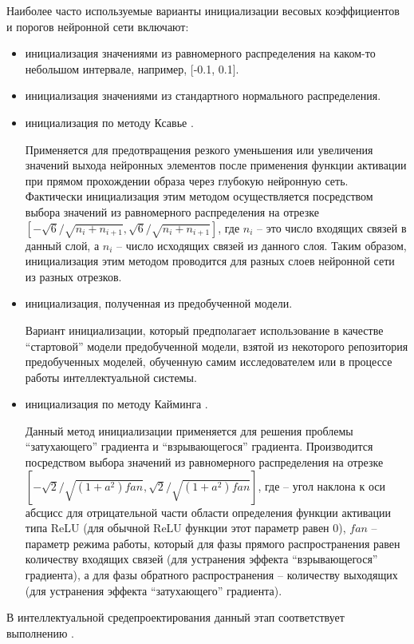 Наиболее часто используемые варианты инициализации весовых коэффициентов и порогов нейронной сети включают:
\begin{itemize}
	\item инициализация значениями из равномерного распределения на каком-то небольшом интервале, например, [-0.1, 0.1].
	\item инициализация значениями из стандартного нормального распределения.
	\item инициализация по методу Ксавье .

	Применяется для предотвращения резкого уменьшения или увеличения значений выхода нейронных элементов после применения функции активации при прямом прохождении образа через глубокую нейронную сеть. Фактически инициализация этим методом осуществляется посредством выбора значений из равномерного распределения на отрезке $[- \sqrt{6} / \sqrt{n_i+n_{i+1}}, \sqrt{6} / \sqrt{n_i+n_{i+1}}]$, где $n_i$ -- это число входящих связей в данный слой, а $n_i$ -- число исходящих связей из данного слоя. Таким образом, инициализация этим методом проводится для разных слоев нейронной сети из разных отрезков.

	\item инициализация, полученная из предобученной модели.

	Вариант инициализации, который предполагает использование в качестве ``стартовой'' модели предобученной модели, взятой из некоторого репозитория предобученных моделей, обученную самим исследователем или в процессе работы интеллектуальной системы.

	\item инициализация по методу Кайминга .

	Данный метод инициализации применяется для решения проблемы ``затухающего'' градиента и ``взрывающегося''
	градиента. Производится посредством выбора значений из равномерного распределения на отрезке $[-\sqrt{2} / \sqrt{(1+a^2)fan}, \sqrt{2} / \sqrt{(1+a^2)fan}]$,
	где  -- угол наклона к оси абсцисс для отрицательной части области определения функции активации типа ReLU (для обычной ReLU функции этот параметр равен 0), $fan$ -- параметр режима работы, который для фазы прямого распространения равен количеству входящих связей (для устранения эффекта ``взрывающегося'' градиента), а для фазы обратного распространения -- количеству выходящих (для устранения эффекта ``затухающего'' градиента).
\end{itemize}

В интеллектуальной средепроектирования данный этап соответствует выполнению .


